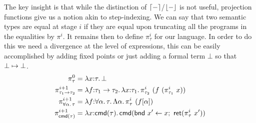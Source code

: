 The key insight is that while the distinction of
$\lceil - \rceil$/$\lfloor - \rfloor$ is not useful, projection functions
give us a notion akin to step-indexing. We can say that two semantic
types are equal at stage $i$ if they are equal upon truncating all the
programs in the equalities by $\pi^i$. It remains then to define
$\pi_\tau^i$ for our language. In order to do this we need a
divergence at the level of expressions, this can be easily
accomplished by adding fixed points or just adding a formal term
$\bot$ so that $\bot \mapsto \bot$.
\begin{align*}
  \pi_\tau^0 &= \lambda x {:} \tau.\, \bot\\
  \pi_{\tau_1 \to \tau_2}^{i + 1} &=
  \lambda f {:} \tau_1 \to \tau_2.\, \lambda x {:} \tau_1.\, \pi_{\tau_2}^i\ (f\ (\pi_{\tau_1}^i\ x))\\
  \pi_{\forall \alpha.\, \tau}^{i + 1} &=
  \lambda f {:} \forall \alpha.\, \tau.\, \Lambda \alpha.\, \pi_\tau^i\ (f[\alpha])\\
  \pi_{\mathsf{cmd}(\tau)}^{i + 1} &=
  \lambda x {:} \mathsf{cmd}(\tau).\, \mathsf{cmd}(\mathsf{bnd}\ x' \gets x;\ \mathsf{ret}(\pi_\tau^i\ x'))
\end{align*}

